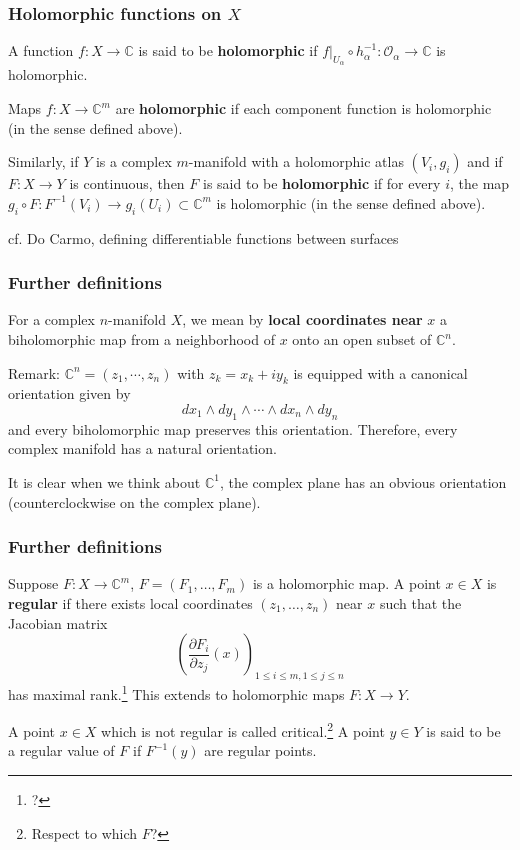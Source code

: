 \documentclass{beamer}
\begin{document}
\begin{frame}
\frametitle{Holomorphic functions on $X$}

A function $f:X\to \mathbb{C}$ is said to be \textbf{holomorphic} if $f|_{U_\alpha} \circ h_\alpha^{-1} : \mathcal{O}_\alpha \to \mathbb{C}$ is holomorphic.

\phantom{?}

Maps $f : X \to \mathbb{C}^m$ are \textbf{holomorphic} if each component function is holomorphic (in the sense defined above).

\phantom{?}

Similarly, if $Y$ is a complex $m$-manifold with a holomorphic atlas $(V_i, g_i)$ and if $F:X \to Y$ is continuous, then $F$ is said to be \textbf{holomorphic} if for every $i$, the map $g_i \circ F : F^{-1}(V_i)\to g_i(U_i) \subset \mathbb{C}^m$ is holomorphic (in the sense defined above). 

\phantom{?}

cf. Do Carmo, defining differentiable functions between surfaces

\end{frame}

\begin{frame}
\frametitle{Further definitions}

For a complex $n$-manifold $X$, we mean by \textbf{local coordinates near} $x$ a biholomorphic map from a neighborhood of $x$ onto an open subset of $\mathbb{C}^n$.

\phantom{?}

Remark: $\mathbb{C}^n = (z_1,\cdots,z_n)$ with $z_k = x_k + iy_k$ is equipped with a canonical orientation given by \[dx_1\wedge dy_1 \wedge \cdots \wedge dx_n\wedge dy_n\] and every biholomorphic map preserves this orientation. Therefore, every complex manifold has a natural orientation.

\phantom{?}

It is clear when we think about $\mathbb{C}^1$, the complex plane has an obvious orientation (counterclockwise on the complex plane).

\end{frame}


\begin{frame}
\frametitle{Further definitions}

Suppose $F:X \to \mathbb{C}^m$, $F = (F_1, \ldots, F_m)$ is a holomorphic map. A point $x \in X$ is \textbf<overlay specification>{regular} if there exists local coordinates $(z_1,\ldots,z_n)$ near $x$ such that the Jacobian matrix \[\left(\frac{\partial F_i}{\partial z_j}(x)\right)_{1\leq i\leq m, 1\leq j\leq n}\]has maximal rank.\footnote{?} This extends to holomorphic maps $F:X \to Y$.

A point $x \in X$ which is not regular is called critical.\footnote{Respect to which $F$?} A point $y \in Y$ is said to be a regular value of $F$ if $F^{-1}(y)$ are regular points.


\end{frame}
\end{document}
